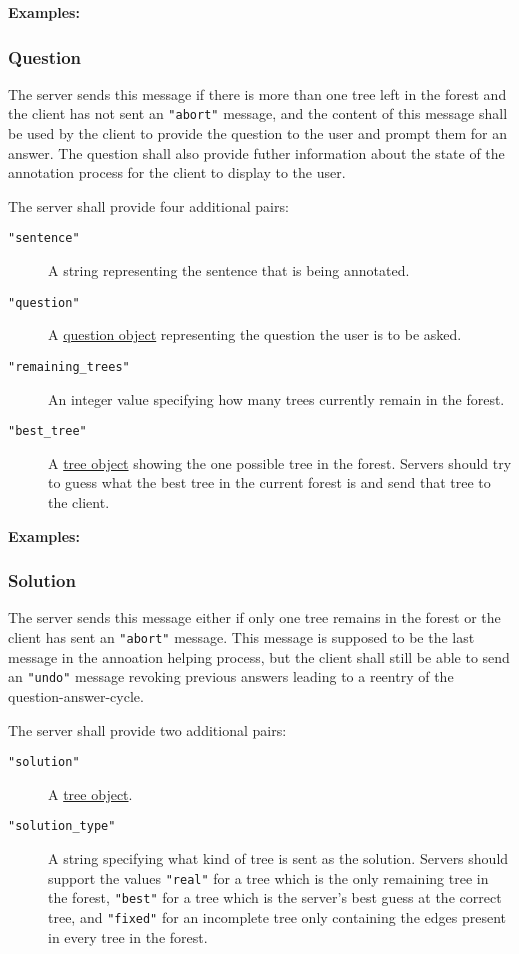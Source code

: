 \documentclass{scrartcl}
\newcommand{\jsstring}[1]{\texttt{\color{OrangeRed}"#1"}}
\newcommand{\Examples}{\noindent\textbf{Examples:}}
\begin{document}
\Examples



\subsubsection{Question}
\label{ssub:Question}

The server sends this message if there is more than one tree left in the forest and the client has not sent an \jsstring{abort} message,
and the content of this message shall be used by the client to provide the question to the user and prompt them for an answer.
The question shall also provide futher information about the state of the annotation process for the client to display to the user.

The server shall provide four additional pairs:
\begin{description}
    \item[\jsstring{sentence}] A string representing the sentence that is being annotated.
    \item[\jsstring{question}] A \hyperref[ssub:Question object]{question object} representing the question the user is to be asked.
    \item[\jsstring{remaining\_trees}] An integer value specifying how many trees currently remain in the forest.
    \item[\jsstring{best\_tree}] A \hyperref[ssub:Tree object]{tree object} showing the one possible tree in the forest.
        Servers should try to guess what the best tree in the current forest is and send that tree to the client.
\end{description}

\Examples



\subsubsection{Solution}
\label{ssub:Solution}

The server sends this message either if only one tree remains in the forest or the client has sent an \jsstring{abort} message.
This message is supposed to be the last message in the annoation helping process, but the client shall still be able to send an \jsstring{undo} message revoking previous answers leading to a reentry of the question-answer-cycle.

The server shall provide two additional pairs:
\begin{description}
    \item[\jsstring{solution}] A \hyperref[ssub:Tree object]{tree object}.
    \item[\jsstring{solution\_type}] A string specifying what kind of tree is sent as the solution.
        Servers should support the values \jsstring{real} for a tree which is the only remaining tree in the forest, \jsstring{best} for a tree which is the server’s best guess at the correct tree, and \jsstring{fixed} for an incomplete tree only containing the edges present in every tree in the forest.
\end{description}
\end{document}
